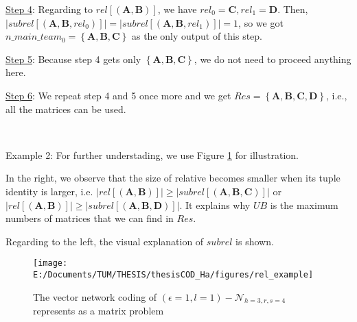 \uline{Step 4}: Regarding to $rel\left[\left(\boldsymbol{A},\boldsymbol{B}\right)\right]$,
we have $rel_{0}=\boldsymbol{C},rel_{1}=\boldsymbol{D}$. Then, $\left|subrel\left[\left(\boldsymbol{A},\boldsymbol{B},rel_{0}\right)\right]\right|=\left|subrel\left[\left(\boldsymbol{A},\boldsymbol{B},rel_{1}\right)\right]\right|=1$,
so we got $n\_main\_team_{0}=\left\{ \boldsymbol{A},\boldsymbol{B},\boldsymbol{C}\right\} $
as the only output of this step.

\uline{Step 5}: Because step 4 gets only $\left\{ \boldsymbol{A},\boldsymbol{B},\boldsymbol{C}\right\} $,
we do not need to proceed anything here.

\uline{Step 6}: We repeat step 4 and 5 once more and we get $Res=\left\{ \boldsymbol{A},\boldsymbol{B},\boldsymbol{C},\boldsymbol{D}\right\} $,
i.e., all the matrices can be used.

~

Example 2: For further understading, we use Figure \ref{fig:rel_example}
for illustration.

In the right, we observe that the size of relative becomes smaller
when its tuple identity is larger, i.e. $\left|rel\left[\left(\boldsymbol{A},\boldsymbol{B}\right)\right]\right|\geq\left|subrel\left[\left(\boldsymbol{A},\boldsymbol{B},\boldsymbol{C}\right)\right]\right|$
or $\left|rel\left[\left(\boldsymbol{A},\boldsymbol{B}\right)\right]\right|\geq\left|subrel\left[\left(\boldsymbol{A},\boldsymbol{B},\boldsymbol{D}\right)\right]\right|$.
It explains why $UB$ is the maximum numbers of matrices that we can
find in $Res$.

Regarding to the left, the visual explanation of $subrel$ is shown.

\begin{figure}[H]
\caption{The vector network coding of $(\epsilon=1,l=1)-\mathcal{N}_{h=3,r,s=4}$
represents as a matrix problem\label{fig:rel_example}}

\texttt{[image: E:/Documents/TUM/THESIS/thesisCOD\_Ha/figures/rel\_example]}
\end{figure}

\clearpage